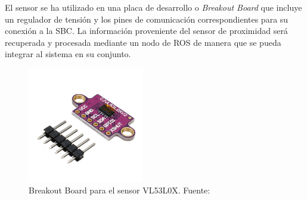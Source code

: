        \begin{table}[!h]
            \centering
            \caption{Características del sensor VL53L0X. Fuente: \cite{vl53l0x}}
            \label{tbl:laserspecs}
            \end{table}
        
            
        El sensor se ha utilizado en una placa de desarrollo o \textit{Breakout Board} que incluye un regulador de tensión 
        y los pines de comunicación correspondientes para su conexión a la SBC. La información proveniente del sensor 
        de proximidad será recuperada y procesada mediante un nodo de ROS de manera que se pueda integrar al sistema 
        en su conjunto.
            
            \begin{figure}[] 
                \centering
                \includegraphics[width=0.45\textwidth]{img/laserbreak}
                \caption[Breakout Board para el sensor VL53L0X]{Breakout Board para el sensor VL53L0X. Fuente: \cite{laser} }
                \label{fig:laserboard}
            \end{figure}
    
